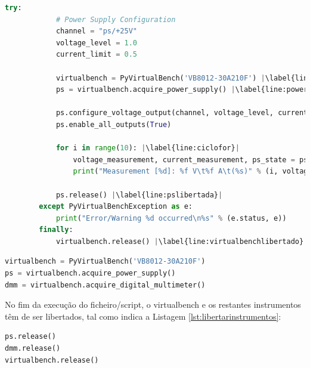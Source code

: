 \begin{minipage}{0.9\linewidth}
	\begin{lstlisting}[language=Python,escapechar=|, caption=Exemplo \textit{ps\_example.py}, label=lst:exemplops]
		try:
			# Power Supply Configuration
			channel = "ps/+25V"
			voltage_level = 1.0
			current_limit = 0.5

			virtualbench = PyVirtualBench('VB8012-30A210F') |\label{line:virtualbench}| 
			ps = virtualbench.acquire_power_supply() |\label{line:powersource}| 

			ps.configure_voltage_output(channel, voltage_level, current_limit)
			ps.enable_all_outputs(True)

			for i in range(10): |\label{line:ciclofor}|
				voltage_measurement, current_measurement, ps_state = ps.read_output(channel)
				print("Measurement [%d]: %f V\t%f A\t(%s)" % (i, voltage_measurement, current_measurement, str(ps_state)))

			ps.release() |\label{line:pslibertada}|
		except PyVirtualBenchException as e:
    		print("Error/Warning %d occurred\n%s" % (e.status, e))
		finally:
    		virtualbench.release() |\label{line:virtualbenchlibertado}|

	\end{lstlisting}
\end{minipage}

\begin{center}
	\begin{minipage}{0.75\linewidth}
		\begin{lstlisting}[language=Python, caption=Chamada do \acrshort{virtualbench} e instrumentos, label=lst:chamadainstrumentos]
virtualbench = PyVirtualBench('VB8012-30A210F')
ps = virtualbench.acquire_power_supply()
dmm = virtualbench.acquire_digital_multimeter()
\end{lstlisting}
	\end{minipage}
\end{center}

No fim da execução do ficheiro/script, o \acrshort{virtualbench} e os restantes instrumentos têm de ser libertados, tal como indica a Listagem \ref{lst:libertarinstrumentos}:
\begin{center}
	\begin{minipage}{0.75\linewidth}
		\begin{lstlisting}[language=Python, caption=Libertar instrumentos e \acrshort{virtualbench}, label=lst:libertarinstrumentos]
ps.release()
dmm.release()
virtualbench.release()
\end{lstlisting}
	\end{minipage}
\end{center}

